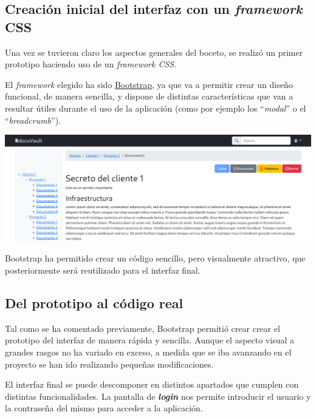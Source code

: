 \documentclass{\ClassPath/viu-tfm-template}
\begin{document}
\subsection{Creación inicial del interfaz con un \textit{framework} CSS}
Una vez se tuvieron claro los aspectos generales del boceto, se realizó un primer prototipo haciendo uso de un \textit{framework CSS}.

El \textit{framework} elegido ha sido \href{https://getbootstrap.com/}{Bootstrap}, ya que va a permitir crear un diseño funcional, de manera sencilla, y dispone de distintas características que  van a resultar útiles durante el uso de la aplicación (como por ejemplo los “\textit{modal}” o el “\textit{breadcrumb}”).

\begin{center}
    \includegraphics[frame,width=\linewidth]{img/boceto2.png}
    \vspace{-20pt}
\end{center}

Bootstrap ha permitido crear un código sencillo, pero visualmente atractivo, que posteriormente será reutilizado para el interfaz final.


\subsection{Del prototipo al código real}

Tal como se ha comentado previamente, Bootstrap permitió crear crear el prototipo del interfaz de manera rápida y sencilla. Aunque el aspecto visual a grandes rasgos no ha variado en exceso, a medida que se iba avanzando en el proyecto se han ido realizando pequeñas modificaciones.

El interfaz final se puede descomponer en distintos apartados que cumplen con distintas funcionalidades. La pantalla de \textit{\textbf{login}} nos permite introducir el usuario y la contraseña del mismo para acceder a la aplicación.
\end{document}
